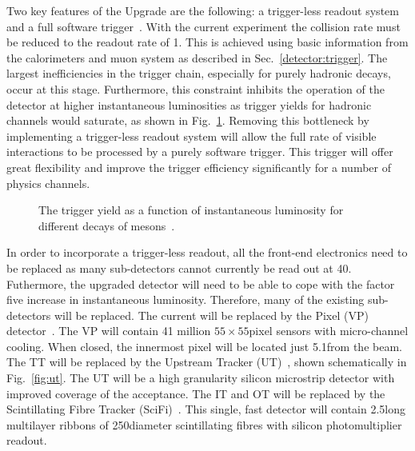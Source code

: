 Two key features of the \lhcb Upgrade are the following: a trigger-less readout system and a full software trigger~\cite{LHCb-TDR-016}. With the current experiment the collision rate must be reduced to the readout rate of 1\mhz. This is achieved using basic information from the calorimeters and muon system as described in Sec.~\ref{detector:trigger}. The largest inefficiencies in the trigger chain, especially for purely hadronic decays, occur at this stage. Furthermore, this constraint inhibits the operation of the detector at higher instantaneous luminosities as trigger yields for hadronic channels would saturate, as shown in Fig.~\ref{fig:upgrade-motivation}. Removing this bottleneck by implementing a trigger-less readout system will allow the full rate of visible interactions to be processed by a purely software trigger. This trigger will offer great flexibility and improve the trigger efficiency significantly for a number of physics channels. %

\begin{figure}[!tb]
\centering
{}
\caption{The trigger yield as a function of instantaneous luminosity for different decays of \B mesons~\cite{upgrade-loi}.}
\label{fig:upgrade-motivation}
\end{figure}

In order to incorporate a trigger-less readout, all the front-end electronics need to be replaced as many sub-detectors cannot currently be read out at 40\mhz. Futhermore, the upgraded detector will need to be able to cope with the factor five increase in instantaneous luminosity. Therefore, many of the existing sub-detectors will be replaced. The current \velo will be replaced by the \velo Pixel (VP) detector~\cite{LHCb-TDR-013}. The VP will contain 41 million $55\times55$\mum pixel sensors with micro-channel \cotwo cooling. When closed, the innermost pixel will be located just 5.1\mm from the \lhc beam. The TT will be replaced by the Upstream Tracker (UT)~\cite{LHCb-TDR-015}, shown schematically in Fig.~\ref{fig:ut}. The UT will be a high granularity silicon microstrip detector with improved coverage of the \lhcb acceptance. The IT and OT will be replaced by the Scintillating Fibre Tracker (SciFi)~\cite{LHCb-TDR-015}. This single, fast detector will contain 2.5\m long multilayer ribbons of 250\mum diameter scintillating fibres with silicon photomultiplier readout.

